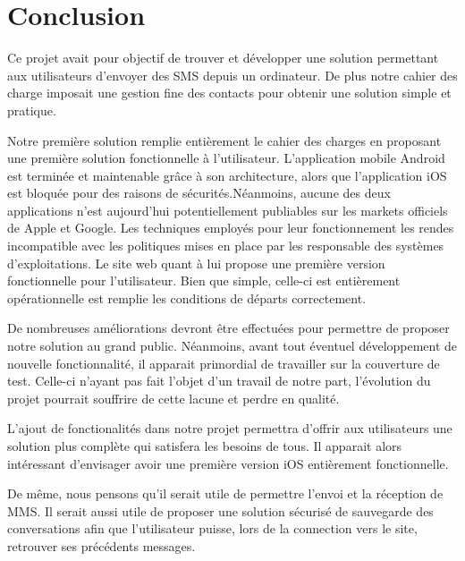 \cleardoublepage



\chapter*{Conclusion}



Ce projet avait pour objectif de trouver et développer une solution permettant aux utilisateurs d'envoyer des SMS depuis un ordinateur.
De plus notre cahier des charge imposait une gestion fine des contacts pour obtenir une solution simple et pratique.

Notre première solution remplie entièrement le cahier des charges en proposant une première solution fonctionnelle à l'utilisateur. 
L'application mobile Android est terminée et maintenable grâce à son architecture, alors que l'application iOS est bloquée pour des raisons de sécurités.Néanmoins, aucune des deux applications n'est aujourd'hui potentiellement publiables sur les markets officiels de Apple et Google. Les techniques employés pour leur fonctionnement les rendes incompatible avec les politiques mises en place par les responsable des systèmes d'exploitations.
Le site web quant à lui propose une première version fonctionnelle pour l'utilisateur. Bien que simple, celle-ci est entièrement opérationnelle est remplie les conditions de départs correctement.

De nombreuses améliorations devront être effectuées pour permettre de proposer notre solution au grand public.
Néanmoins, avant tout éventuel développement de nouvelle fonctionnalité, il apparait primordial de travailler sur la couverture de test. Celle-ci 
n'ayant pas fait l'objet d'un travail de notre part, l'évolution du projet pourrait souffrire de cette lacune et perdre en qualité.

L'ajout de fonctionalités dans notre projet permettra d'offrir aux utilisateurs une solution plus complète qui satisfera les besoins de tous.
Il apparait alors intéressant d'envisager avoir une première version iOS entièrement fonctionnelle.

De même, nous pensons qu'il serait utile de permettre l'envoi et la réception de MMS. Il serait aussi utile de proposer une solution sécurisé de sauvegarde des conversations afin que l'utilisateur puisse, lors de la connection vers le site, retrouver ses précédents messages.
